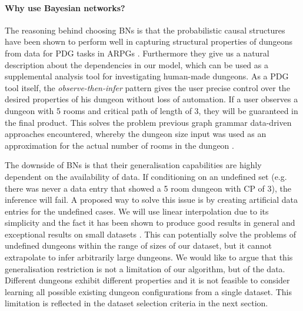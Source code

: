 \documentclass{UoYCSproject}
\begin{document}
\paragraph{Why use Bayesian networks?}
The reasoning behind choosing BNs is that the probabilistic causal structures have been shown to perform well in capturing structural properties of dungeons from data for PDG tasks in ARPGs \parencite{SummervilleLearningOfZelda,SummervilleSamplingHyrule}. Furthermore they give us a natural description about the dependencies in our model, which can be used as a supplemental analysis tool for investigating human-made dungeons. As a PDG tool itself, the \textit{observe-then-infer} pattern gives the user precise control over the desired properties of his dungeon without loss of automation. If a user observes a dungeon with 5 rooms and critical path of length of 3, they will be guaranteed in the final product. This solves the problem previous graph grammar data-driven approaches encountered, whereby the dungeon size input was used as an approximation for the actual number of rooms in the dungeon \parencite{Deery}.

The downside of BNs is that their generalisation capabilities are highly dependent on the availability of data. If conditioning on an undefined set (e.g. there was never a data entry that showed a 5 room dungeon with CP of 3), the inference will fail. A proposed way to solve this issue is by creating artificial data entries for the undefined cases. We will use linear interpolation due to its simplicity and the fact it has been shown to produce good results in general \parencite{Ibargengoytia2013OnTE} and exceptional results on small datasets \parencite{yu2004advances}. This can potentially solve the problems of undefined dungeons within the range of sizes of our dataset, but it cannot extrapolate to infer arbitrarily large dungeons. We would like to argue that this generalisation restriction is not a limitation of our algorithm, but of the data. Different dungeons exhibit different properties and it is not feasible to consider learning all possible existing dungeon configurations from a single dataset. This limitation is reflected in the dataset selection criteria in the next section.
\end{document}
